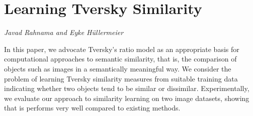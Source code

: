 \documentclass[../booklet.tex]{subfiles}
\begin{document}
\section[Learning Tversky Similarity. {\it Javad Rahnama and Eyke Hüllermeier}]{Learning Tversky Similarity}
 

\begin{center}
  {\it Javad Rahnama and Eyke Hüllermeier}
\end{center}

\vskip 0.8cm


In this paper, we advocate Tversky's ratio model as an appropriate basis for computational approaches to semantic similarity, that is, the comparison of objects such as images in a semantically meaningful way. We consider the problem of learning Tversky similarity measures from suitable training data indicating whether two objects tend to be similar or dissimilar. Experimentally, we evaluate our approach to similarity learning on two image datasets, showing that is performs very well compared to existing methods.

\end{document}
